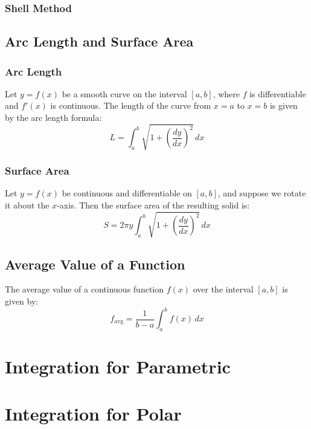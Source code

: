 \documentclass[11pt]{article}
\begin{document}
\subsubsection{Shell Method}
\subsection{Arc Length and Surface Area}
\subsubsection{Arc Length}
Let $y = f(x)$ be a smooth curve on the interval $[a, b]$, where $f$ is differentiable and $f'(x)$ is continuous. The length of the curve from $x = a$ to $x = b$ is given by the arc length formula:
\[
    L = \int_a^b \sqrt{1 + \left(\frac{dy}{dx}\right)^2} \, dx
\]
\subsubsection{Surface Area}
Let $y = f(x)$ be continuous and differentiable on $[a, b]$, and suppose we rotate it about the $x$-axis. Then the surface area of the resulting solid is:
\[
    S = 2\pi y \int_a^b \sqrt{1 + \left(\frac{dy}{dx}\right)^2} \, dx
\]
\subsection{Average Value of a Function}
The average value of a continuous function $f(x)$ over the interval $[a, b]$ is given by:
\[
    f_{\text{avg}} = \frac{1}{b - a} \int_a^b f(x)\,dx
\]
\begin{figure}[H]
    \centering
\end{figure}
\section{Integration for Parametric}
\section{Integration for Polar}
\end{document}
